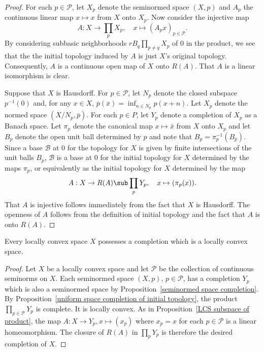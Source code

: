 \begin{proof}
For each $p\in\mathscr{P}$, let $X_p$ denote the seminormed space $(X,p)$ and $A_p$ the continuous linear map $x\mapsto x$ from $X$ onto $X_p$. Now consider the injective map
\[A:X\to\prod_pX_p,\quad x\mapsto(A_px)_{p\in\mathscr{P}}.\]
By considering subbasic neighborhoods $rB_q\prod_{p\neq q}X_p$ of $0$ in the product, we see that the the initial topology induced by $A$ is just $X$'s original topology. Consequently, $A$ is a continuous open map of $X$ onto $R(A)$. That $A$ is a linear isomorphism is clear.\par
Suppose that $X$ is Hausdorff. For $p\in\mathscr{P}$, let $N_p$ denote the closed subspace $p^{-1}(0)$ and, for any $x\in X$, $\bar{p}(\bar{x})=\inf_{n\in N_p}p(x+n)$. Let $X_p$ denote the normed space $(X/N_p,\bar{p})$. For each $p\in P$, let $Y_p$ denote a completion of $X_p$ as a Banach space. Let $\pi_p$ denote the canonical map $x\mapsto\bar{x}$ from $X$ onto $X_p$ and let $B_p$ denote the open unit ball determined by $p$ and note that $B_p=\pi_p^{-1}(B_{\bar{p}})$. Since a base $\mathcal{B}$ at $0$ for the topology for $X$ is given by finite intersections of the unit balls $B_p$, $\mathcal{B}$ is a base at $0$ for the initial topology for $X$ determined by the maps $\pi_p$, or equivalently as the initial topology for $X$ determined by the map
\[A:X\to R(A)\sub\prod_pY_p,\quad x\mapsto(\pi_p(x)).\]
That $A$ is injective follows immediately from the fact that $X$ is Hausdorff. The openness of $A$ follows from the definition of initial topology and the fact that $A$ is onto $R(A)$.
\end{proof}
\begin{proposition}\label{LCS completion}
Every locally convex space $X$ possesses a completion which is a locally convex space.
\end{proposition}
\begin{proof}
Let $X$ be a locally convex space and let $\mathscr{P}$ be the collection of continuous seminorms on $X$. Each seminormed space $(X,p)$, $p\in\mathscr{P}$, has a completion $Y_p$ which is also a seminormed space by Proposition~\ref{seminormed space completion}. By Proposition~\ref{uniform space completion of initial topology}, the product $\prod_{p\in\mathscr{P}}Y_p$ is complete. It is locally convex. As in Proposition~\ref{LCS subspace of product}, the map $A:X\to Y_p,x\mapsto(x_p)$ where $x_p=x$ for each $p\in\mathscr{P}$ is a linear homeomorphism. The closure of $R(A)$ in $\prod_pY_p$ is therefore the desired completion of $X$.
\end{proof}
